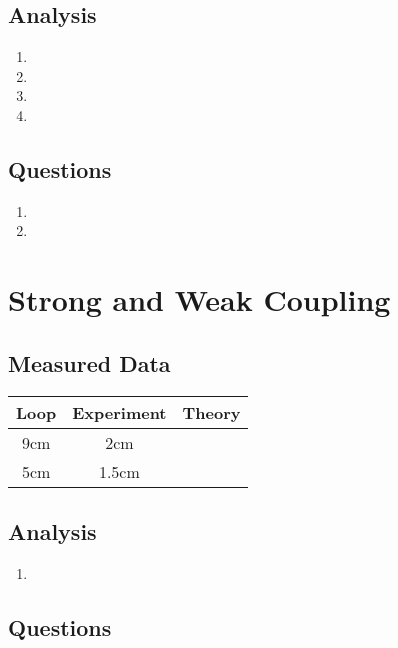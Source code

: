 \documentclass{article}
\begin{document}
\subsection{Analysis}

\begin{enumerate}
	\item
	\item
	\item
	\item
\end{enumerate}

\subsection{Questions}

\begin{enumerate}
	\item
	\item
\end{enumerate}


\section{Strong and Weak Coupling}

\subsection{Measured Data}
\begin{table}[H]
\centering
\begin{tabular}{|c|c|c|}
\hline
Loop & Experiment & Theory \\ \hline
9cm & 2cm & \\ \hline
5cm & 1.5cm & \\ \hline
\end{tabular}
\end{table}

\subsection{Analysis}

\begin{enumerate}
	\item 
\end{enumerate}

\subsection{Questions}
\end{document}
